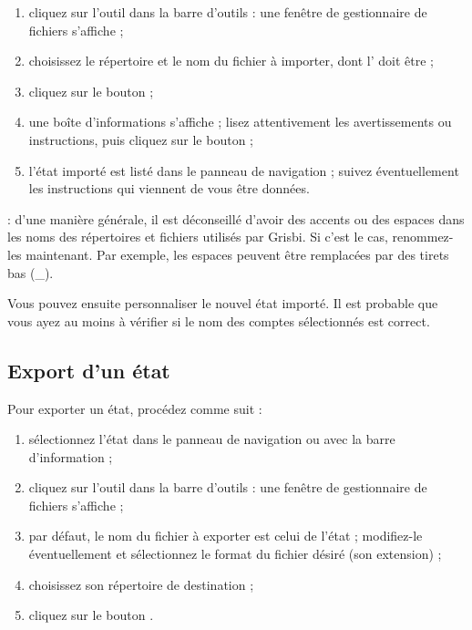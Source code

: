 \begin{enumerate}
	 \item cliquez sur l'outil  dans la barre d'outils : une fenêtre de gestionnaire de fichiers s'affiche ;
	 \item choisissez le répertoire et le nom du fichier à importer, dont l' doit être  ;
	 \item cliquez sur le bouton  ; 
	 \item une boîte d'informations s'affiche ; lisez attentivement les avertissements ou instructions, puis cliquez sur le bouton  ;
	 \item l'état importé est listé dans le panneau de navigation ; suivez éventuellement les instructions qui viennent de vous être données.
\end{enumerate}

 : d'une manière générale, il est déconseillé d'avoir des accents ou des espaces dans les noms des répertoires et fichiers utilisés par Grisbi. Si c'est le cas, renommez-les maintenant. Par exemple, les espaces peuvent être remplacées par des tirets bas (\_).

Vous pouvez ensuite personnaliser le nouvel état importé. Il est probable que vous ayez au moins à vérifier si le nom des comptes sélectionnés est correct.


\subsection{Export d'un état\label{reports-importexport-export} }

Pour exporter un état, procédez comme suit :

\begin{enumerate}
	 \item sélectionnez l'état dans le panneau de navigation ou avec la barre d'information ;
	 \item  cliquez sur l'outil  dans la barre d'outils : une fenêtre de gestionnaire de fichiers s'affiche ;
	 \item par défaut, le nom du fichier à exporter est celui de l'état ;
	modifiez-le éventuellement et sélectionnez le format du fichier désiré (son extension) ;
	 \item choisissez son répertoire de destination ;
	 \item cliquez sur le bouton .
\end{enumerate}

